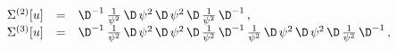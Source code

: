 \begin{equation*}
\begin{array}{rcl}
\Sigma^{(2)}[u] &=&
\D^{-1}\,\frac{1}{\psi^2}\,\D\,\psi^2\,\D\,\psi^2\,\D\,\frac{1}{\psi^2}\,\D^{-1}\,,
\\
\Sigma^{(3)}[u] &=&
\D^{-1}\,\frac{1}{\psi^2}\,\D\,\psi^2\,\D\,\psi^2\,\D\,\frac{1}{\psi^2}\,\D^{-1}\,\frac{1}{\psi^2}\,\D\,\psi^2\,\D\,\psi^2\,\D\,\frac{1}{\psi^2}\,\D^{-1}\,,
\end{array}
\end{equation*}

